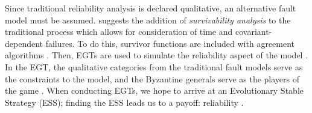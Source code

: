 \documentclass[twoside, conference]{IEEEtran}
\begin{document}
Since traditional reliability analysis is declared qualitative, an alternative fault model must be assumed. \cite{Ma2008} suggests the addition of \textit{survivability analysis} to the traditional process which allows for consideration of time and covariant-dependent failures. To do this, survivor functions are included with agreement algorithms \cite{Ma2008}. Then, EGTs are used to simulate the reliability aspect of the model \cite{Ma2008}. In the EGT, the qualitative categories from the traditional fault models serve as the constraints to the model, and the Byzantine generals serve as the players of the game \cite{Ma2008}. When conducting EGTs, we hope to arrive at an Evolutionary Stable Strategy (ESS); finding the ESS leads us to a payoff: reliability \cite{Ma2008}. 



\end{document}
